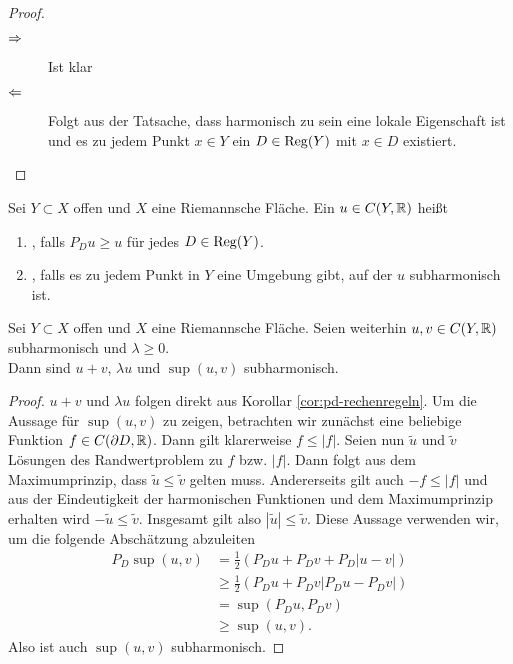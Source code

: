 \begin{proof}
  \begin{description}
  \item[$\Rightarrow$] Ist klar
  \item[$\Leftarrow$] Folgt aus der Tatsache, dass harmonisch zu sein eine
    lokale Eigenschaft ist und es zu jedem Punkt $x \in Y$ ein $D \in
    \operatorname{Reg}(Y)$ mit $x \in D$ existiert.
  \end{description}
\end{proof}

\begin{defin}
  Sei $Y \subset X$ offen und $X$ eine Riemannsche Fläche.
  Ein $u \in C(Y, \mathbb{R})$ heißt
  \begin{enumerate}
  \item {}, falls $P_D u \geq u$ für jedes $D \in \operatorname{Reg}(Y)$.
  \item {}, falls es zu jedem Punkt in $Y$
    eine Umgebung gibt, auf der $u$ subharmonisch ist.
  \end{enumerate}
\end{defin}
\begin{cor}
  Sei $Y \subset X$ offen und $X$ eine Riemannsche Fläche. Seien
  weiterhin $u,v \in C(Y, \mathbb{R})$ subharmonisch und $\lambda \geq 0$. \\
  Dann sind $u+v$, $\lambda u$ und $\sup(u,v)$ subharmonisch.
\end{cor}

\begin{proof}
  $u+v$ und $\lambda u$ folgen direkt aus Korollar
  \ref{cor:pd-rechenregeln}. Um die Aussage für $\sup(u,v)$ zu zeigen,
  betrachten wir zunächst eine beliebige Funktion $f \in C(\partial D,
  \mathbb{R})$. Dann gilt klarerweise $f \leq |f|$. Seien nun $\tilde u$ und
  $\tilde v$ Lösungen des Randwertproblem zu $f$ bzw. $|f|$. Dann
  folgt aus dem Maximumprinzip, dass $\tilde u \leq \tilde v$ gelten
  muss. Andererseits gilt auch $-f \leq |f|$ und aus der Eindeutigkeit
  der harmonischen Funktionen und dem Maximumprinzip erhalten wird $-
  \tilde u \leq \tilde v$. Insgesamt gilt also $|\tilde u| \leq \tilde
  v$. Diese Aussage verwenden wir, um die folgende Abschätzung abzuleiten
  \begin{align*}
    P_D \sup(u,v) & = \frac{1}{2} ( P_D u + P_D v + P_D|u - v|) \\
    & \geq \frac12 (P_D u + P_D v |P_D u - P_D v|) \\
    & = \sup(P_D u, P_D v) \\
    & \geq \sup(u,v).
  \end{align*}
  Also ist auch $\sup(u,v)$ subharmonisch.
\end{proof}

